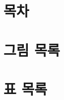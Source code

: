 \setlength{\cftbeforechapskip}{10pt}   %
\setlength{\cftbeforesecskip}{5pt}     %
\setlength{\cftbeforesubsecskip}{0pt}  %










\usepackage{etoolbox}

\usepackage{etoc}

\usepackage{etoolbox}
\makeatletter
\patchcmd{\tableofcontents}
  {\chapter*{\contentsname}}%
  {\chapter*{\fontsize{20}{24}\selectfont\bfseries\centering 목차}}%
  {}{}
\patchcmd{\listoffigures}
  {\chapter*{\listfigurename}}
  {\chapter*{\fontsize{18}{22}\selectfont\bfseries\centering 그림 목록}}%
  {}{}
\patchcmd{\listoftables}
  {\chapter*{\listtablename}}
  {\chapter*{\fontsize{18}{22}\selectfont\bfseries\centering 표 목록}}%
  {}{}
\makeatother
